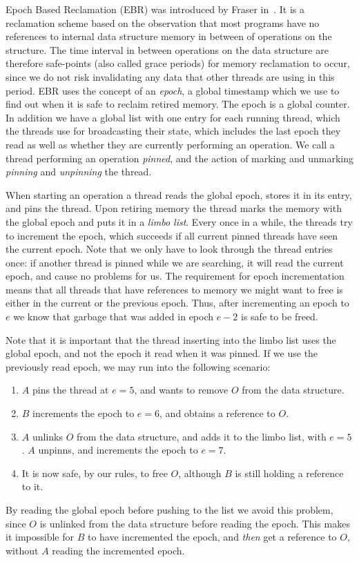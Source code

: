 Epoch Based Reclamation (EBR) was introduced by Fraser in~\cite{fraser2004practical}. It is a
reclamation scheme based on the observation that most programs have no references to internal data
structure memory in between of operations on the structure. The time interval in between operations
on the data structure are therefore safe-points (also called grace periods) for memory reclamation
to occur, since we do not risk invalidating any data that other threads are using in this period.
EBR uses the concept of an \emph{epoch}, a global timestamp which we use to find out when it is
safe to reclaim retired memory. The epoch is a global counter. In addition we have a global list
with one entry for each running thread, which the threads use for broadcasting their state, which
includes the last epoch they read as well as whether they are currently performing an operation. We
call a thread performing an operation \emph{pinned}, and the action of marking and unmarking
\emph{pinning} and \emph{unpinning} the thread.

When starting an operation a thread reads the global epoch, stores it in its entry, and pins the
thread. Upon retiring memory the thread marks the memory with the global epoch and puts it in a
\emph{limbo list}. Every once in a while, the threads try to increment the epoch, which succeeds if
all current pinned threads have seen the current epoch. Note that we only have to look through the
thread entries once: if another thread is pinned while we are searching, it will read the current
epoch, and cause no problems for us. The requirement for epoch incrementation means that all
threads that have references to memory we might want to free is either in the current or the
previous epoch. Thus, after incrementing an epoch to $e$ we know that garbage that was added in
epoch $e-2$ is safe to be freed.

Note that it is important that the thread inserting into the limbo list uses the global epoch, and
not the epoch it read when it was pinned. If we use the previously read epoch, we may run into the
following scenario: \begin{enumerate} \item $A$ pins the thread at $e=5$, and wants to remove $O$
from the data structure.  \item $B$ increments the epoch to $e=6$, and obtains a reference to $O$.
\item $A$ unlinks $O$ from the data structure, and adds it to the limbo list, with $e=5$. $A$
unpinns, and increments the epoch to $e=7$.  \item It is now safe, by our rules, to free $O$,
although $B$ is still holding a reference to it.  \end{enumerate} By reading the global epoch
before pushing to the list we avoid this problem, since $O$ is unlinked from the data structure
before reading the epoch. This makes it impossible for $B$ to have incremented the epoch, and
\emph{then} get a reference to $O$, without $A$ reading the incremented epoch.


